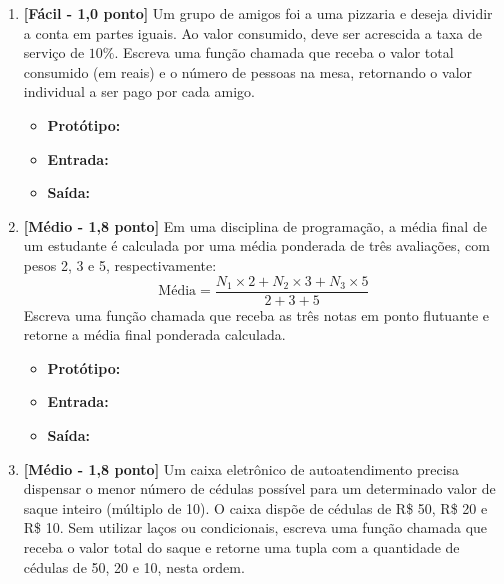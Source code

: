 \begin{enumerate}[label=\textbf{Q\arabic*.}, start=1]


\vspace{0.4cm}

\item \textbf{[Fácil - 1,0 ponto]} Um grupo de amigos foi a uma pizzaria e deseja dividir a conta em partes iguais. Ao valor consumido, deve ser acrescida a taxa de serviço de $10\%$. Escreva uma função chamada  que receba o valor total consumido (em reais) e o número de pessoas na mesa, retornando o valor individual a ser pago por cada amigo.

\begin{itemize}[leftmargin=*]
    \item \textbf{Protótipo:}\newline {}
    \item \textbf{Entrada:} 
    \item \textbf{Saída:} 
\end{itemize}



\vspace{0.4cm}

\item \textbf{[Médio - 1,8 ponto]} Em uma disciplina de programação, a média final de um estudante é calculada por uma média ponderada de três avaliações, com pesos 2, 3 e 5, respectivamente:
\[
\text{Média} = \frac{N_1 \times 2 + N_2 \times 3 + N_3 \times 5}{2 + 3 + 5}
\]
Escreva uma função chamada  que receba as três notas em ponto flutuante e retorne a média final ponderada calculada.

\begin{itemize}[leftmargin=*]
    \item \textbf{Protótipo:}\newline {}
    \item \textbf{Entrada:} 
    \item \textbf{Saída:} 
\end{itemize}



\vspace{0.4cm}

\item \textbf{[Médio - 1,8 ponto]} Um caixa eletrônico de autoatendimento precisa dispensar o menor número de cédulas possível para um determinado valor de saque inteiro (múltiplo de 10). O caixa dispõe de cédulas de R\$ 50, R\$ 20 e R\$ 10. Sem utilizar laços ou condicionais, escreva uma função chamada  que receba o valor total do saque e retorne uma tupla com a quantidade de cédulas de 50, 20 e 10, nesta ordem.


\end{enumerate}
